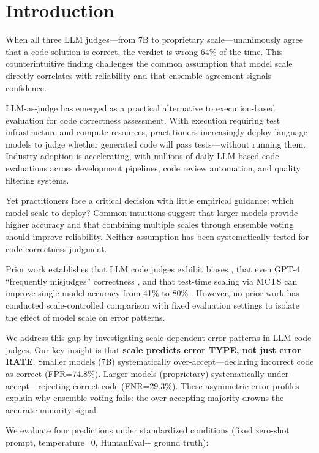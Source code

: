 \section{Introduction}

When all three LLM judges---from 7B to proprietary scale---unanimously agree that a code solution is correct, the verdict is wrong 64\% of the time. This counterintuitive finding challenges the common assumption that model scale directly correlates with reliability and that ensemble agreement signals confidence.

LLM-as-judge has emerged as a practical alternative to execution-based evaluation for code correctness assessment. With execution requiring test infrastructure and compute resources, practitioners increasingly deploy language models to judge whether generated code will pass tests---without running them. Industry adoption is accelerating, with millions of daily LLM-based code evaluations across development pipelines, code review automation, and quality filtering systems.

Yet practitioners face a critical decision with little empirical guidance: which model scale to deploy? Common intuitions suggest that larger models provide higher accuracy and that combining multiple scales through ensemble voting should improve reliability. Neither assumption has been systematically tested for code correctness judgment.

Prior work establishes that LLM code judges exhibit biases \cite{moon2025biases}, that even GPT-4 ``frequently misjudges'' correctness \cite{crupi2025effectiveness}, and that test-time scaling via MCTS can improve single-model accuracy from 41\% to 80\% \cite{wang2025mctsjudge}. However, no prior work has conducted scale-controlled comparison with fixed evaluation settings to isolate the effect of model scale on error patterns.

We address this gap by investigating scale-dependent error patterns in LLM code judges. Our key insight is that \textbf{scale predicts error TYPE, not just error RATE}. Smaller models (7B) systematically over-accept---declaring incorrect code as correct (FPR=74.8\%). Larger models (proprietary) systematically under-accept---rejecting correct code (FNR=29.3\%). These asymmetric error profiles explain why ensemble voting fails: the over-accepting majority drowns the accurate minority signal.

We evaluate four predictions under standardized conditions (fixed zero-shot prompt, temperature=0, HumanEval+ ground truth):

